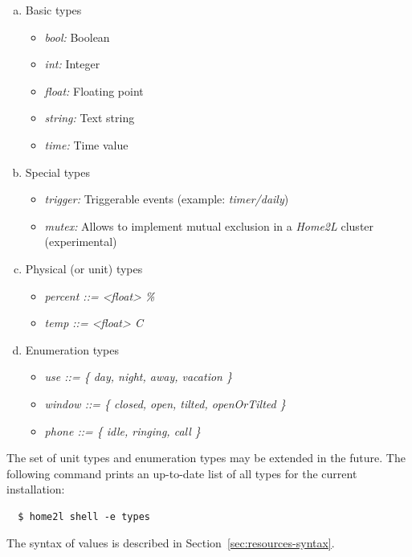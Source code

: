 \documentclass[12pt,english,parskip=half,headheight=19pt]{scrreprt}
\begin{document}
\begin{enumerate}[a)]

\item Basic types
  \begin{itemize}
    \item \textit{bool:} Boolean
    \item \textit{int:} Integer
    \item \textit{float:} Floating point
    \item \textit{string:} Text string
    \item \textit{time:} Time value
  \end{itemize}

\item Special types
  \begin{itemize}
    \item \textit{trigger:}  Triggerable events (example: \textit{timer/daily})
    \item \textit{mutex:} Allows to implement mutual exclusion in a \textit{Home2L} cluster (experimental)
  \end{itemize}

\item Physical (or unit) types
  \begin{itemize}
    \item \textit{percent ::= <float> \%}
    \item \textit{temp ::= <float> \textdegree C}
  \end{itemize}

\item Enumeration types
  \begin{itemize}
    \item \textit{use ::= \{ day, night, away, vacation \}}
    \item \textit{window ::= \{ closed, open, tilted, openOrTilted \}}
    \item \textit{phone ::= \{ idle, ringing, call \}}
  \end{itemize}

\end{enumerate}

The set of unit types and enumeration types may be extended in the future.
The following command prints an up-to-date list of all types for the current installation:
\begin{lstlisting}
  $ home2l shell -e types
\end{lstlisting}

The syntax of values is described in Section~\ref{sec:resources-syntax}.
\end{document}
